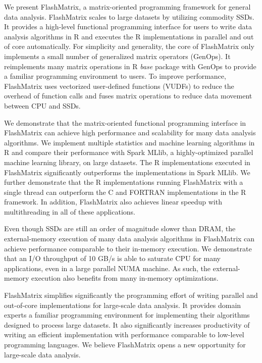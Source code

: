 We present FlashMatrix, a matrix-oriented programming framework for general
data analysis. FlashMatrix scales to large datasets by utilizing commodity SSDs.
It provides a high-level functional programming interface for users to write
data analysis algorithms in R and
executes the R implementations in parallel and out of core automatically.
For simplicity and generality, the core of FlashMatrix only implements
a small number of generalized matrix operators (GenOps). It reimplements
many matrix operations in R \textit{base} package with GenOps to provide
a familiar programming environment to users. To improve performance,
FlashMatrix uses vectorized user-defined functions (VUDFs) to reduce the
overhead of function calls and fuses matrix operations to reduce data movement
between CPU and SSDs.

We demonstrate that the matrix-oriented functional programming interface in
FlashMatrix can achieve high performance and scalability for many data analysis
algorithms. We implement multiple statistics and
machine learning algorithms in R and compare their performance with Spark
MLlib, a highly-optimized parallel machine learning library, on large datasets.
The R implementations executed in FlashMatrix significantly outperforms
the implementations in Spark MLlib. We further demonstrate that
the R implementations running FlashMatrix with a single thread can outperform
the C and FORTRAN implementations in the R framework. In addition, FlashMatrix
also achieves linear speedup with multithreading in all of these applications.

Even though SSDs are still an order of magnitude slower than DRAM, the external-memory
execution of many data analysis algorithms in FlashMatrix can achieve performance
comparable to their in-memory execution. We demonstrate that an I/O throughput
of 10 GB/s is able to saturate CPU for many applications, even in a large parallel
NUMA machine. As such, the external-memory execution also benefits from many in-memory
optimizations.

FlashMatrix simplifies significantly the programming effort of writing
parallel and out-of-core implementations for large-scale data analysis. It
provides domain experts a familiar programming environment for implementing
their algorithms designed to process large datasets. It also significantly
increases productivity of writing an efficient implementation with performance
comparable to low-level programming languages. We believe FlashMatrix opens
a new opportunity for large-scale data analysis.
